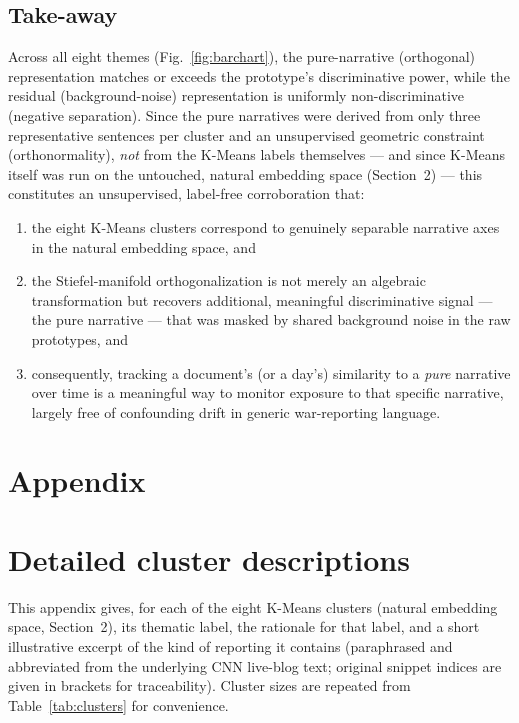 \documentclass[11pt]{article}
\begin{document}
\subsection{Take-away}
Across all eight themes (Fig.~\ref{fig:barchart}), the pure-narrative
(orthogonal) representation matches or exceeds the prototype's
discriminative power, while the residual (background-noise) representation
is uniformly non-discriminative (negative separation). Since the pure
narratives were derived from only three representative sentences per
cluster and an unsupervised geometric constraint (orthonormality),
\emph{not} from the K-Means labels themselves --- and since K-Means itself
was run on the untouched, natural embedding space (Section~2) --- this
constitutes an unsupervised, label-free corroboration that:
\begin{enumerate}
    \item the eight K-Means clusters correspond to genuinely separable narrative axes in the natural embedding space, and
    \item the Stiefel-manifold orthogonalization is not merely an algebraic transformation but recovers additional, meaningful discriminative signal --- the pure narrative --- that was masked by shared background noise in the raw prototypes, and
    \item consequently, tracking a document's (or a day's) similarity to a \emph{pure} narrative over time is a meaningful way to monitor exposure to that specific narrative, largely free of confounding drift in generic war-reporting language.
\end{enumerate}


\clearpage
\appendix
\section*{Appendix}

\section{Detailed cluster descriptions}
\label{app:clusters}

This appendix gives, for each of the eight K-Means clusters (natural
embedding space, Section~2), its thematic label, the rationale for that
label, and a short illustrative excerpt of the kind of reporting it
contains (paraphrased and abbreviated from the underlying CNN live-blog
text; original snippet indices are given in brackets for traceability).
Cluster sizes are repeated from Table~\ref{tab:clusters} for convenience.
\end{document}
